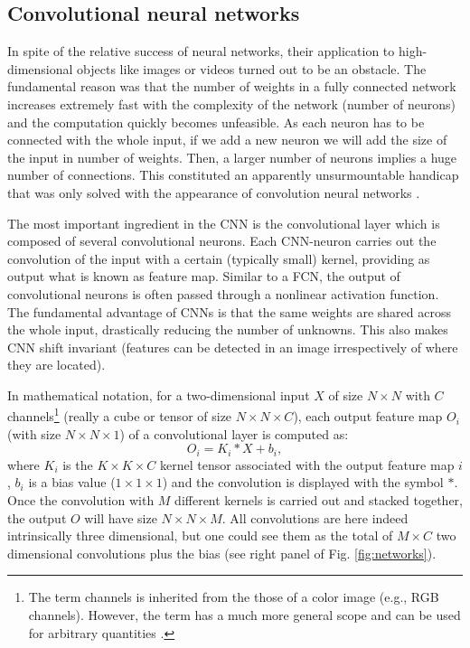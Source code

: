 \subsection{Convolutional neural networks}
In spite of the relative success of neural networks, their application to 
high-dimensional objects like images or videos turned out to be
an obstacle. The fundamental reason was that the number of
weights in a fully connected network increases extremely fast with the complexity of the network (number of neurons) and the computation quickly becomes unfeasible.
As each neuron has to be connected with the whole input, if we add a new neuron we will add the size of the input in number of weights. Then, a larger number of neurons implies a huge number of connections.
This constituted an
apparently unsurmountable handicap that was only solved with the
appearance of convolution neural networks \cite[CNN or ConvNets;][]{LeCun1998}.




The most important ingredient in the CNN is the convolutional layer which is composed of
several convolutional neurons. Each CNN-neuron carries out the convolution of the input with a certain
(typically small) kernel, providing as output what is known as feature map. Similar to a FCN, the output of
convolutional neurons is often passed through a nonlinear activation function.
The fundamental advantage of CNNs is that the same weights are shared across the whole input, 
drastically reducing the number of unknowns. This also makes
CNN shift invariant (features can be detected in an image irrespectively of
where they are located). 


In mathematical notation, for a two-dimensional input $X$
of size $N \times N$ with $C$ channels\footnote{The term channels is inherited from
the those of a color image (e.g., RGB channels). However, the term has a much more general
scope and can be used for arbitrary quantities \cite[see][for an application]{Asensio2017}.} 
(really a cube or tensor of size $N \times N \times C$), each output feature map $O_i$ (with size $N \times N \times 1$) of a convolutional layer is computed as:
\begin{equation}
O_i=K_i * X + b_i,
\end{equation}
where $K_i$ is the $K \times K \times C$ kernel tensor associated with the output feature map $i$, 
$b_i$ is a bias value ($1 \times 1 \times 1$) and the convolution is displayed with the symbol $*$. 
Once the convolution with $M$ different kernels is carried out and stacked together, the output 
$O$ will have size $N \times N \times M$. All convolutions are here indeed intrinsically three dimensional, 
but one could see them as the total of $M \times C$ two dimensional convolutions plus the 
bias (see right panel of Fig. \ref{fig:networks}).

